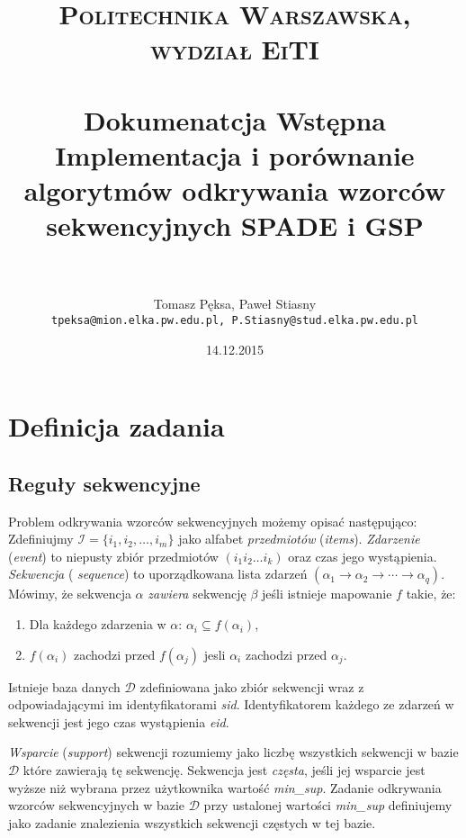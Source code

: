 \documentclass[paper=a4, fontsize=11pt]{scrartcl} %
\title{	
\normalfont \normalsize 
\textsc{Politechnika Warszawska, wydział EiTI} \\ [25pt] %
\horrule{0.5pt} \\[0.4cm] %
\huge Dokumenatcja Wstępna \\ %
\large Implementacja i porównanie algorytmów odkrywania wzorców sekwencyjnych SPADE i GSP \\
\horrule{2pt} \\[0.5cm] %
}
\author{Tomasz Pęksa, Paweł Stiasny \\ \texttt{\small tpeksa@mion.elka.pw.edu.pl, P.Stiasny@stud.elka.pw.edu.pl}}
\date{\normalsize14.12.2015} %
\numberwithin{equation}{section} %
\numberwithin{figure}{section} %
\numberwithin{table}{section} %
\begin{document}
\maketitle %


\section{Definicja zadania}

\subsection{Reguły sekwencyjne}

Problem odkrywania wzorców sekwencyjnych możemy opisać następująco: Zdefiniujmy
\( \mathcal I = \{ i_1, i_2, \ldots, i_m \} \) jako alfabet {\em przedmiotów}
({\em items}).  {\em Zdarzenie} ({\em event}) to niepusty zbiór przedmiotów \(
( i_1i_2\ldots i_k ) \) oraz czas jego wystąpienia.  {\em Sekwencja} ({\em
sequence}) to uporządkowana lista zdarzeń \( ( \alpha_1 \rightarrow \alpha_2 \rightarrow \cdots \rightarrow \alpha_q ) \).
Mówimy, że sekwencja \( \alpha \) {\em zawiera} sekwencję \( \beta \) jeśli
istnieje mapowanie \( f \) takie, że:
\begin{enumerate}
    \item Dla każdego zdarzenia w \( \alpha \): \( \alpha_i \subseteq f(\alpha_i) \),
    \item \( f(\alpha_i) \) zachodzi przed \( f(\alpha_j) \) jesli \( \alpha_i \)
        zachodzi przed \( \alpha_j \).
\end{enumerate}

Istnieje baza danych \( \mathcal D \) zdefiniowana jako zbiór sekwencji wraz
z odpowiadającymi im identyfikatorami {\em sid}.  Identyfikatorem każdego ze
zdarzeń w sekwencji jest jego czas wystąpienia {\em eid}.

{\em Wsparcie} ({\em support}) sekwencji rozumiemy jako liczbę wszystkich
sekwencji w bazie \( \mathcal D \) które zawierają tę sekwencję.  Sekwencja
jest {\em częsta}, jeśli jej wsparcie jest wyższe niż wybrana przez użytkownika
wartość {\em min\_sup}.  Zadanie odkrywania wzorców sekwencyjnych w bazie \(
\mathcal D \) przy ustalonej wartości {\em min\_sup} definiujemy jako zadanie
znalezienia wszystkich sekwencji częstych w tej bazie.
\end{document}
